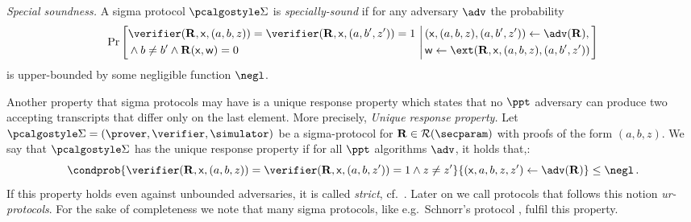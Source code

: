 \documentclass[runningheads,11pt]{llncs}
\newcommand{\ourpar}[1] {\smallskip\noindent\emph{#1}}
\begin{document}
\ourpar{Special soundness.}
A sigma protocol $\sigmaprot$ is \emph{specially-sound}
  if for any adversary $\adv$ the probability
\[
\Pr\left[
\begin{aligned}
& \verifier(\REL, \inp, (a, b, z)) = %
\verifier(\REL, \inp, (a, b', z')) = 1 \\
& \land b \neq b' \land \REL(\inp, \wit) = 0 \\
\end{aligned}
\,\left|\,
\begin{aligned}
& (\inp, (a, b, z), (a, b', z')) \gets \adv(\REL), \\ %
& \wit \gets \ext(\REL, \inp, (a, b, z), (a, b', z'))\\
\end{aligned}
\right.\right]
\]
is upper-bounded by some negligible function $\negl$.

Another property that sigma protocols may have is a unique response
property \cite{C:Fischlin05} which states that no $\ppt$ adversary can
produce two accepting transcripts that differ only on the last
element. More precisely, 
\ourpar{Unique response property.} Let
$\sigmaprot = (\prover, \verifier, \simulator)$ be a sigma-protocol for
$\REL \in \RELGEN(\secparam)$ with proofs of the form
$(a, b, z)$. We say that $\sigmaprot$ has the unique response property if for
all $\ppt$ algorithms $\adv$, it holds that,:
\[ \condprob{\verifier (\REL, \inp, (a, b, z)) = \verifier (\REL, \inp, (a, b,
	z')) = 1 \land z \neq z'}{(\inp, a, b, z, z') \gets \adv(\REL)} \leq \negl\,.  \]
If this property holds even against unbounded adversaries, it is called
\emph{strict}, cf.~\cite{INDOCRYPT:FKMV12}. Later on we call protocols that
follows this notion \emph{ur-protocols}. For the sake of completeness we note
that many sigma protocols, like e.g.~Schnorr's protocol \cite{C:Schnorr89},
fulfil this property.
\end{document}
